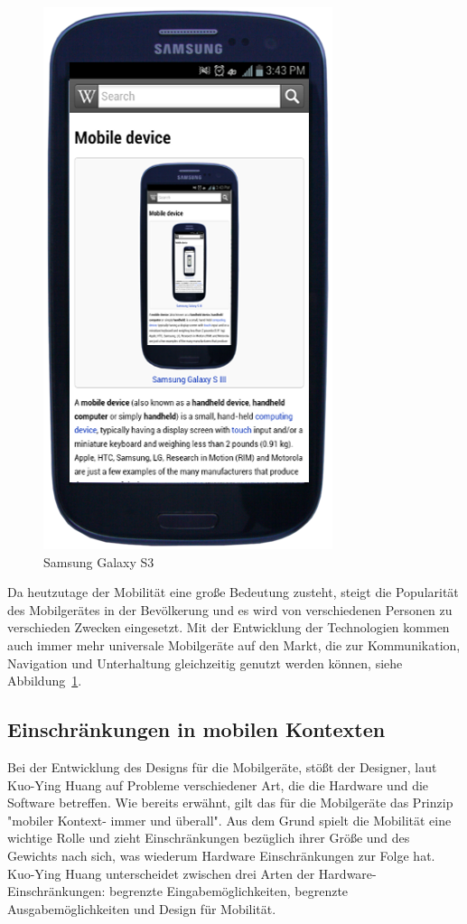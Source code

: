  \begin{figure}[h]
 \centering
 \includegraphics[height=0.25\textheight]{img/Samsung_Galaxy_S_III_Pebble_Blue_WikiWikipedia.png}
 \caption{Samsung Galaxy S3}\label{fig:galaxys3}
\end{figure}

Da heutzutage der Mobilität eine große Bedeutung zusteht, steigt die Popularität des Mobilgerätes in der Bevölkerung und es wird von verschiedenen Personen zu verschieden Zwecken eingesetzt.  Mit der Entwicklung der Technologien kommen auch immer mehr universale Mobilgeräte auf den Markt, die zur Kommunikation, Navigation und Unterhaltung gleichzeitig genutzt werden können, siehe Abbildung~\ref{fig:galaxys3}. 


\subsection{Einschränkungen in mobilen Kontexten} %
\label{sub:einschr_nkungen_in_mobilen_kontexten}
Bei der Entwicklung des Designs für die Mobilgeräte, stößt der Designer, laut Kuo-Ying Huang \cite{challhcimd} auf Probleme verschiedener Art, die die Hardware und die Software betreffen. 
Wie bereits erwähnt, gilt das für die Mobilgeräte das Prinzip "mobiler Kontext- immer und überall". Aus dem Grund spielt die Mobilität eine wichtige Rolle und zieht Einschränkungen bezüglich ihrer Größe und des Gewichts nach sich, was wiederum Hardware Einschränkungen zur Folge hat. Kuo-Ying Huang \cite{challhcimd} unterscheidet zwischen drei Arten der Hardware-Einschränkungen: begrenzte Eingabemöglichkeiten, begrenzte Ausgabemöglichkeiten und Design für Mobilität.

